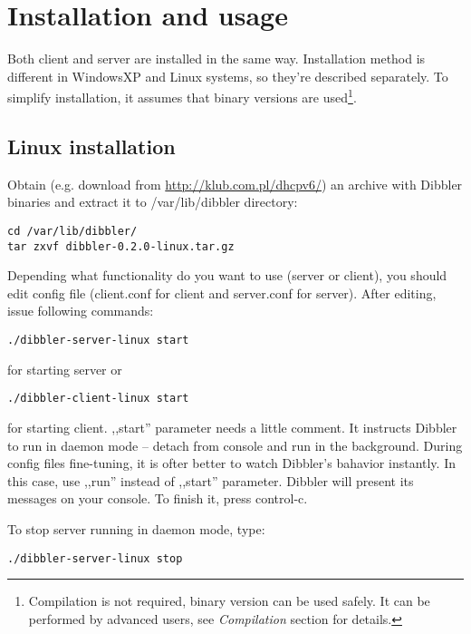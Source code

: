 
\section{Installation and usage}
Both client and server are installed in the same way. Installation
method is different in WindowsXP and Linux systems, so they're described
separately. To simplify installation, it assumes that binary versions
are used\footnote{Compilation is not
  required, binary version can be used safely. It can be performed by
  advanced users, see \emph{Compilation} section for details.}.

\subsection{Linux installation}
Obtain (e.g. download from \url{http://klub.com.pl/dhcpv6/}) an archive with
Dibbler binaries and extract it to /var/lib/dibbler directory:
\begin{verbatim}
cd /var/lib/dibbler/
tar zxvf dibbler-0.2.0-linux.tar.gz 
\end{verbatim}

Depending what functionality do you want to use (server or client),
you should edit config file (client.conf for client and server.conf
for server). After editing, issue following commands:

\begin{verbatim}
./dibbler-server-linux start
\end{verbatim}

for starting server or

\begin{verbatim}
./dibbler-client-linux start
\end{verbatim}

for starting client. ,,start'' parameter needs a little comment. It
instructs Dibbler to run in daemon mode -- detach from console and run
in the background. During config files fine-tuning, it is ofter better
to watch Dibbler's bahavior instantly. In this case, use ,,run''
instead of ,,start'' parameter. Dibbler will present its messages on
your console. To finish it, press control-c.

To stop server running in daemon mode, type:
\begin{verbatim}
./dibbler-server-linux stop
\end{verbatim}

